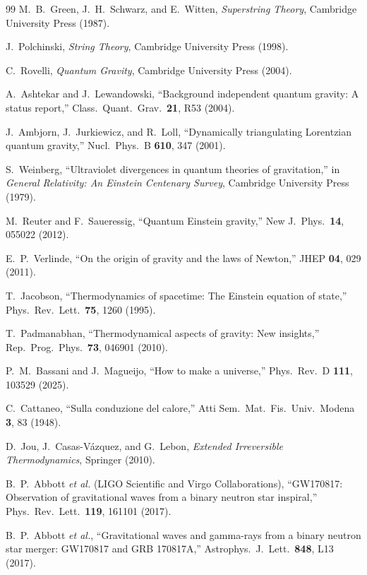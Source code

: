 \documentclass[aps,prd,twocolumn,showpacs,superscriptaddress,preprintnumbers]{revtex4-2}
\begin{document}
\begin{thebibliography}{99}
M.~B.~Green, J.~H.~Schwarz, and E.~Witten,
\textit{Superstring Theory},
Cambridge University Press (1987).

J.~Polchinski,
\textit{String Theory},
Cambridge University Press (1998).

C.~Rovelli,
\textit{Quantum Gravity},
Cambridge University Press (2004).

A.~Ashtekar and J.~Lewandowski,
``Background independent quantum gravity: A status report,''
Class.\ Quant.\ Grav.\ \textbf{21}, R53 (2004).

J.~Ambjorn, J.~Jurkiewicz, and R.~Loll,
``Dynamically triangulating Lorentzian quantum gravity,''
Nucl.\ Phys.\ B \textbf{610}, 347 (2001).

S.~Weinberg,
``Ultraviolet divergences in quantum theories of gravitation,''
in \textit{General Relativity: An Einstein Centenary Survey},
Cambridge University Press (1979).

M.~Reuter and F.~Saueressig,
``Quantum Einstein gravity,''
New J.\ Phys.\ \textbf{14}, 055022 (2012).

E.~P.~Verlinde,
``On the origin of gravity and the laws of Newton,''
JHEP \textbf{04}, 029 (2011).

T.~Jacobson,
``Thermodynamics of spacetime: The Einstein equation of state,''
Phys.\ Rev.\ Lett.\ \textbf{75}, 1260 (1995).

T.~Padmanabhan,
``Thermodynamical aspects of gravity: New insights,''
Rep.\ Prog.\ Phys.\ \textbf{73}, 046901 (2010).

P.~M.~Bassani and J.~Magueijo,
``How to make a universe,''
Phys.\ Rev.\ D \textbf{111}, 103529 (2025).

C.~Cattaneo,
``Sulla conduzione del calore,''
Atti Sem.\ Mat.\ Fis.\ Univ.\ Modena \textbf{3}, 83 (1948).

D.~Jou, J.~Casas-V{\'a}zquez, and G.~Lebon,
\textit{Extended Irreversible Thermodynamics},
Springer (2010).

B.~P.~Abbott \textit{et al.} (LIGO Scientific and Virgo Collaborations),
``GW170817: Observation of gravitational waves from a binary neutron star inspiral,''
Phys.\ Rev.\ Lett.\ \textbf{119}, 161101 (2017).

B.~P.~Abbott \textit{et al.},
``Gravitational waves and gamma-rays from a binary neutron star merger: GW170817 and GRB 170817A,''
Astrophys.\ J.\ Lett.\ \textbf{848}, L13 (2017).


\end{thebibliography}
\end{document}
